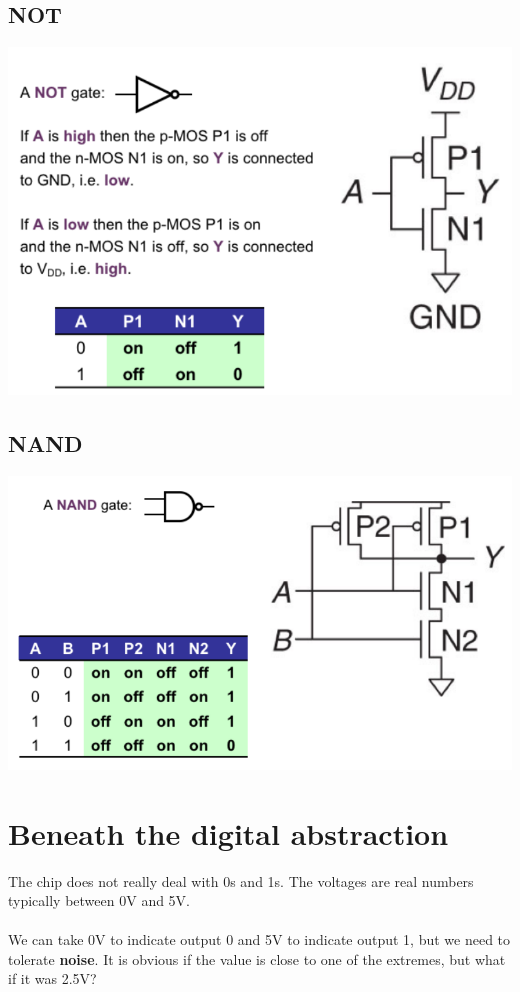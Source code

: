 \documentclass{article}[18pt]
\begin{document}
\subsection{NOT}
\includegraphics[width=15cm]{NOTTrans.png}
\subsection{NAND}
\includegraphics[width=15cm]{NANDTrans.png}
\section{Beneath the digital abstraction}
The chip does not really deal with 0s and 1s. The voltages are real numbers typically between 0V and 5V.\\
\\
We can take 0V to indicate output 0 and 5V to indicate output 1, but we need to tolerate \textbf{noise}. It is obvious if the value is close to one of the extremes, but what if it was 2.5V?
\end{document}
